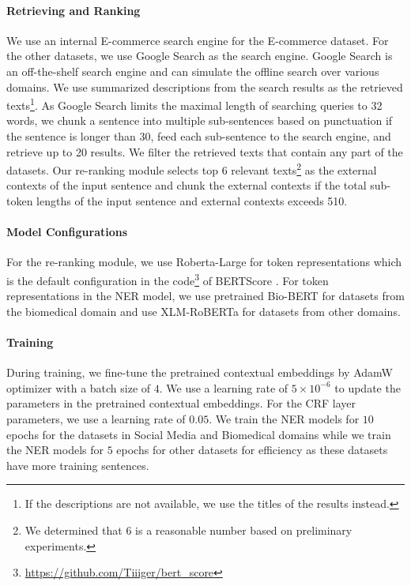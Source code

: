 \documentclass[11pt,a4paper]{article}
\begin{document}
\paragraph{Retrieving and Ranking} We use an internal E-commerce search engine for the E-commerce dataset. For the other datasets, we use Google Search as the search engine. Google Search is an off-the-shelf search engine and can simulate the offline search over various domains.
We use summarized descriptions from the search results as the retrieved texts\footnote{If the descriptions are not available, we use the titles of the results instead.}. As Google Search limits the maximal length of searching queries to 32 words, we chunk a sentence into multiple sub-sentences based on punctuation if the sentence is longer than 30, feed each sub-sentence to the search engine, and retrieve up to 20 results. We filter the retrieved texts that contain any part of the datasets. Our re-ranking module selects top $6$ relevant texts\footnote{We determined that $6$ is a reasonable number based on preliminary experiments.} as the external contexts of the input sentence and chunk the external contexts if the total sub-token lengths of the input sentence and external contexts exceeds 510.

\paragraph{Model Configurations}
For the re-ranking module, we use Roberta-Large \citep{liu2019roberta} for token representations which is the default configuration in the code\footnote{\url{https://github.com/Tiiiger/bert_score}} of BERTScore \citep{Zhang*2020BERTScore:}. For token representations in the NER model, we use pretrained Bio-BERT \citep{lee2020biobert} for datasets from the biomedical domain and use XLM-RoBERTa \citep{conneau-etal-2020-unsupervised} for datasets from other domains. 

\paragraph{Training} 
During training, we fine-tune the pretrained contextual embeddings by AdamW \citep{loshchilov2018decoupled} optimizer with a batch size of $4$. We use a learning rate of $5\times 10^{-6}$ to update the parameters in the pretrained contextual embeddings. For the CRF layer parameters, we use a learning rate of $0.05$. We train the NER models for $10$ epochs for the datasets in Social Media and Biomedical domains while we train the NER models for $5$ epochs for other datasets for efficiency as these datasets have more training sentences.
\end{document}
